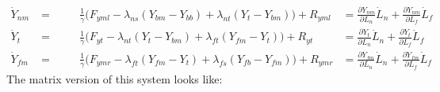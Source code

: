 \documentclass[
11pt, %
english, %
singlespacing, %
headsepline, %
chapterinoneline, %
]{MastersDoctoralThesis} %
\begin{document}
\begin{align}
  \dot{Y}_{nm} &= \hspace{1cm} \frac{1}{\gamma} \Big(F_{yml} - \lambda_{ns}(Y_{bm} - Y_{bb})
  + \lambda_{nt}(Y_{t } - Y_{bm}) \Big) + R_{yml}
  &= \frac{\partial Y_{nm}}{\partial L_n}\dot{L}_n + \frac{\partial Y_{nm}}{\partial L_f}\dot{L}_f\\
  \dot{Y}_{t}  &= \hspace{1cm} \frac{1}{\gamma} \Big(F_{yt } - \lambda_{nt}(Y_{t } - Y_{bm})
  + \lambda_{ft}(Y_{fm} - Y_{t }) \Big) + R_{yt }
  &= \frac{\partial Y_{t}}{\partial L_n}\dot{L}_n + \frac{\partial Y_{t}}{\partial L_f}\dot{L}_f\\
  \dot{Y}_{fm} &= \hspace{1cm} \frac{1}{\gamma} \Big(F_{ymr} - \lambda_{ft}(Y_{fm} - Y_{t })
  + \lambda_{fs}(Y_{fb} - Y_{fm}) \Big) + R_{ymr}
  &= \frac{\partial Y_{fm}}{\partial L_n}\dot{L}_n + \frac{\partial Y_{fm}}{\partial L_f}\dot{L}_f
\end{align}
%
The matrix version of this system looks like:
\end{document}
